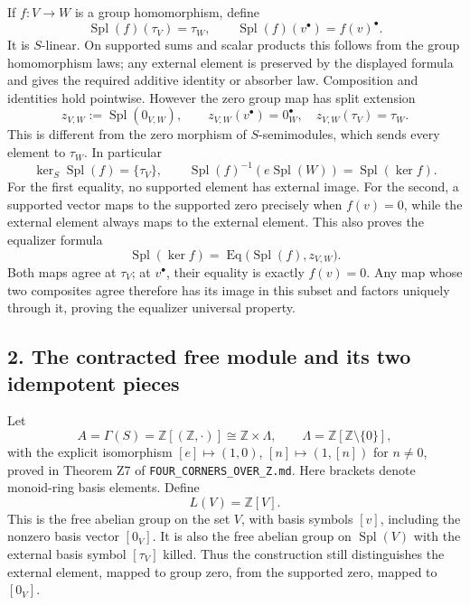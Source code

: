 \documentclass[
]{article}
\begin{document}
If \(f:V\to W\) is a group homomorphism, define \[
\operatorname{Spl}(f)(\tau_V)=\tau_W,
\qquad\operatorname{Spl}(f)(v^\bullet)=f(v)^\bullet.
\tag{Q4}
\] It is \(S\)-linear. On supported sums and scalar products this
follows from the group homomorphism laws; any external element is
preserved by the displayed formula and gives the required additive
identity or absorber law. Composition and identities hold pointwise.
However the zero group map has split extension \[
z_{V,W}:=\operatorname{Spl}(0_{V,W}),\qquad
z_{V,W}(v^\bullet)=0_W^\bullet,\quad
z_{V,W}(\tau_V)=\tau_W.
\tag{Q5}
\] This is different from the zero morphism of \(S\)-semimodules, which
sends every element to \(\tau_W\). In particular \[
\ker_S\operatorname{Spl}(f)=\{\tau_V\},
\qquad
\operatorname{Spl}(f)^{-1}(e\operatorname{Spl}(W))
=\operatorname{Spl}(\ker f).
\tag{Q6}
\] For the first equality, no supported element has external image. For
the second, a supported vector maps to the supported zero precisely when
\(f(v)=0\), while the external element always maps to the external
element. This also proves the equalizer formula \[
\operatorname{Spl}(\ker f)
=\operatorname{Eq}\bigl(\operatorname{Spl}(f),z_{V,W}\bigr).
\tag{Q7}
\] Both maps agree at \(\tau_V\); at \(v^\bullet\), their equality is
exactly \(f(v)=0\). Any map whose two composites agree therefore has its
image in this subset and factors uniquely through it, proving the
equalizer universal property.

\subsection{2. The contracted free module and its two idempotent
pieces}\label{the-contracted-free-module-and-its-two-idempotent-pieces}

Let \[
A=\Gamma(S)=\mathbb Z[(\mathbb Z,\cdot)]
\cong\mathbb Z\times\Lambda,
\qquad
\Lambda=\mathbb Z[\mathbb Z\setminus\{0\}],
\tag{Q8}
\] with the explicit isomorphism \([e]\mapsto(1,0)\),
\([n]\mapsto(1,[n])\) for \(n\ne0\), proved in Theorem Z7 of
\texttt{FOUR\_CORNERS\_OVER\_Z.md}. Here brackets denote monoid-ring
basis elements. Define \[
L(V)=\mathbb Z[V].
\tag{Q9}
\] This is the free abelian group on the set \(V\), with basis symbols
\([v]\), including the nonzero basis vector \([0_V]\). It is also the
free abelian group on \(\operatorname{Spl}(V)\) with the external basis
symbol \([\tau_V]\) killed. Thus the construction still distinguishes
the external element, mapped to group zero, from the supported zero,
mapped to \([0_V]\).
\end{document}
